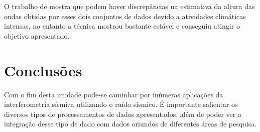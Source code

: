 \documentclass[paper,twocolumn]{geophysics}
\begin{document}
O trabalho de \cite{bromirski_ocean_1999} mostra que podem haver discrepâncias na estimativa da altura das ondas obtidas por esses dois conjuntos de dados devido a atividades climáticas intensas, no entanto a técnica mostrou bastante estável e conseguiu atingir o objetivo apresentado.


\section*{Conclusões}

Com o fim desta unidade pode-se caminhar por inúmeras aplicações da interferometria sísmica utilizando o ruído sísmico. É importante salientar os diversos tipos de processamentos de dados apresentados, além de poder ver a integração desse tipo de dado com dados oriundos de diferentes áreas de pesquisa. 



    
\end{document}
